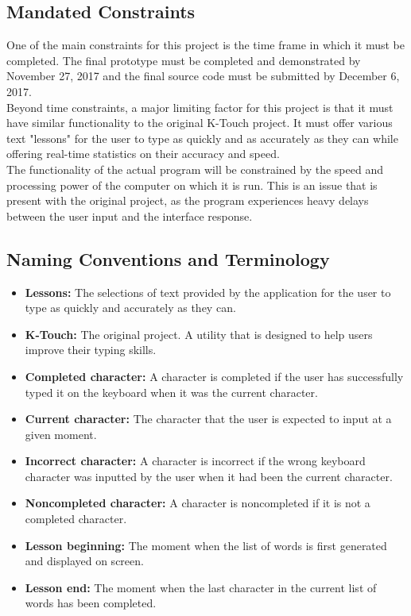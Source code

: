 \documentclass[12pt, titlepage]{article}
\begin{document}
\subsection{Mandated Constraints}
\indent \indent One of the main constraints for this project is the time frame in which it must be completed. The final prototype must be completed and demonstrated by November 27, 2017 and the final source code must be submitted by December 6, 2017.
\\
\indent Beyond time constraints, a major limiting factor for this project is that it must have similar functionality to the original K-Touch project. It must offer various text "lessons" for the user to type as quickly and as accurately as they can while offering real-time statistics on their accuracy and speed. 
\\
\indent The functionality of the actual program will be constrained by the speed and processing power of the computer on which it is run. This is an issue that is present with the original project, as the program experiences heavy delays between the user input and the interface response.


\subsection{Naming Conventions and Terminology}

\begin{itemize}
    \item \textbf{Lessons:} The selections of text provided by the application for the user to type as quickly and accurately as they can.
    \item \textbf{K-Touch:} The original project. A utility that is designed to help users improve their typing skills.
    \item\textbf{Completed character:} A character is completed if the user has successfully typed it on the keyboard when it was the current character. 
    \item \textbf{Current character:} The character that the user is expected to input at a given moment.
    \item\textbf{Incorrect character:} A character is incorrect if the wrong keyboard character was inputted by the user when it had been the current character.
    \item\textbf{Noncompleted character:} A character is noncompleted if it is not a completed character.
    \item \textbf{Lesson beginning:} The moment when the list of words is first generated and displayed on screen.
    \item \textbf{Lesson end:} The moment when the last character in the current list of words has been completed.
\end{itemize}
\end{document}
